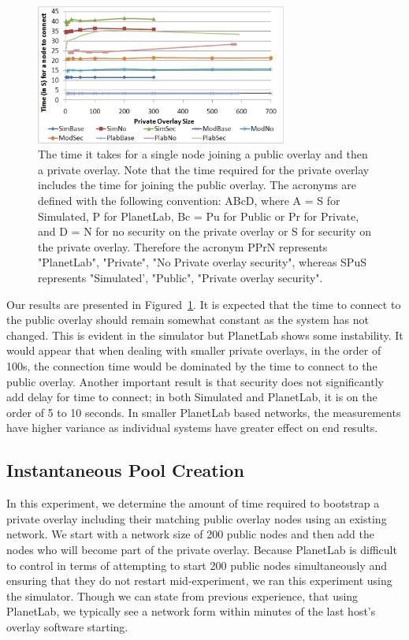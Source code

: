 \documentclass[conference]{IEEEtran}
\begin{document}
\begin{figure}[h]
\centering
\includegraphics[width=3.25in]{single_join.eps}
\caption{The time it takes for a single node joining a public overlay and then
a private overlay. Note that the time required for the private overlay includes the
time for joining the public overlay.  The acronyms are defined with the following convention:  ABcD,
where A = S for Simulated, P for PlanetLab, Bc = Pu for Public or Pr for Private,
and D = N for no security on the private overlay or S for security on the private
overlay.  Therefore the acronym PPrN represents "PlanetLab", "Private", "No
Private overlay security", whereas SPuS represents "Simulated', "Public",
"Private overlay security".}
\label{fig:single_join}
\end{figure}

Our results are presented in Figured~\ref{fig:single_join}.  It is expected that the time to
connect to the public overlay should remain somewhat constant as the system
has not changed.  This is evident in the simulator but PlanetLab shows
some instability.  It would appear that when dealing with smaller private
overlays, in the order of 100s, the connection time would be dominated by the
time to connect to the public overlay.  Another important result is that
security does not significantly add delay for time to connect; in both
Simulated and PlanetLab, it is on the order of 5 to 10 seconds.  In smaller 
PlanetLab based networks, the measurements have
higher variance as individual systems have greater effect on end results.

\subsection{Instantaneous Pool Creation}
\label{mass_join}
In this experiment, we determine the amount of time required to bootstrap a
private overlay including their matching public overlay nodes using an existing
network.  We start with a network size of 200 public nodes and then add the
nodes who will become part of the private overlay.  Because PlanetLab is
difficult to control in terms of attempting to start 200 public nodes
simultaneously and ensuring that they do not restart mid-experiment, we ran
this experiment using the simulator.  Though we can state from previous
experience, that using PlanetLab, we typically see a network form within
minutes of the last host's overlay software starting.
\end{document}
